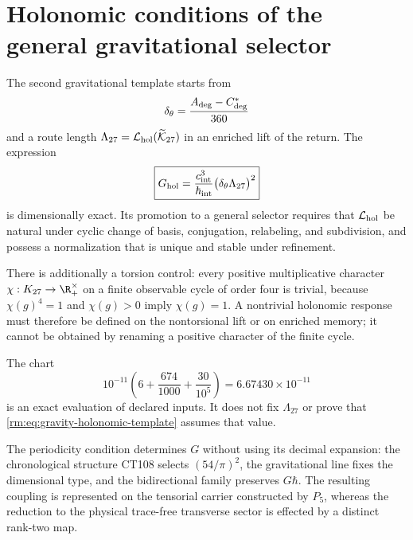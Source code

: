 \section{Holonomic conditions of the general gravitational selector}

The second gravitational template starts from
\begin{equation}
\label{rm:eq:gravity-delta-theta}
\delta_\theta
=\frac{A_{\rm deg}-C^*_{\rm deg}}{360}
\end{equation}
and a route length
\(\Lambda_{27}=\mathcal L_{\rm hol}(\widetilde{\mathcal K}_{27})\)
in an enriched lift of the return. The expression
\begin{equation}
\label{rm:eq:gravity-holonomic-template}
\boxed{
G_{\rm hol}
=\frac{c_{\rm int}^3}{\hbar_{\rm int}}
\bigl(\delta_\theta\Lambda_{27}\bigr)^2}
\end{equation}
is dimensionally exact. Its promotion to a general selector requires that
\(\mathcal L_{\rm hol}\) be natural under cyclic change of basis,
conjugation, relabeling, and subdivision, and possess a normalization
that is unique and stable under refinement.

There is additionally a torsion control: every positive multiplicative
character \(\chi:K_{27}\to\R_+^\times\) on a finite observable cycle of order
four is trivial, because \(\chi(g)^4=1\) and \(\chi(g)>0\) imply
\(\chi(g)=1\). A nontrivial holonomic response must therefore
be defined on the nontorsional lift or on enriched
memory; it cannot
be obtained by renaming a positive character of the finite cycle.

The chart
\begin{equation}
\label{rm:eq:gravity-decimal-chart}
10^{-11}\left(6+\frac{674}{1000}+\frac{30}{10^5}\right)
=6.67430\times10^{-11}
\end{equation}
is an exact evaluation of declared inputs. It does not fix
\(\Lambda_{27}\) or prove that \cref{rm:eq:gravity-holonomic-template}
assumes that value.

\begin{keyresult}
The periodicity condition determines \(G\) without using its decimal
expansion: the chronological structure CT108 selects \((54/\pi)^2\), the
gravitational line fixes the dimensional type, and the bidirectional family
preserves \(G\hbar\). The resulting coupling is represented on the
tensorial carrier constructed by \(P_5\), whereas the reduction to the
physical trace-free transverse sector is effected by a distinct
rank-two map.
\end{keyresult}

